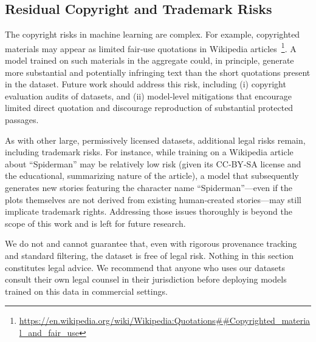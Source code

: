 \subsection{Residual Copyright and Trademark Risks}
The copyright risks in machine learning are complex. For example, copyrighted materials may appear as limited fair‑use quotations in Wikipedia articles~\footnote{\url{https://en.wikipedia.org/wiki/Wikipedia:Quotations##Copyrighted_material_and_fair_use}}. A model trained on such materials in the aggregate could, in principle, generate more substantial and potentially infringing text than the short quotations present in the dataset. Future work should address this risk, including (i) copyright evaluation audits of datasets, and (ii) model‑level mitigations that encourage limited direct quotation and discourage reproduction of substantial protected passages.

As with other large, permissively licensed datasets, additional legal risks remain, including trademark risks. For instance, while training on a Wikipedia article about “Spiderman” may be relatively low risk (given its CC‑BY‑SA license and the educational, summarizing nature of the article), a model that subsequently generates new stories featuring the character name “Spiderman”—even if the plots themselves are not derived from existing human‑created stories—may still implicate trademark rights. Addressing those issues thoroughly is beyond the scope of this work and is left for future research.

We do not and cannot guarantee that, even with rigorous provenance tracking and standard filtering, the dataset is free of legal risk. Nothing in this section constitutes legal advice. We recommend that anyone who uses our datasets consult their own legal counsel in their jurisdiction before deploying models trained on this data in commercial settings.
